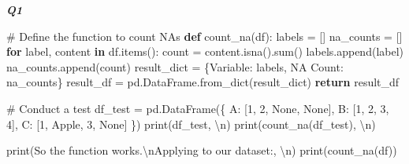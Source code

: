 \documentclass[
  letterpaper,
  DIV=11,
  numbers=noendperiod]{scrartcl}
\newenvironment{Shaded}{\begin{snugshade}}{\end{snugshade}}
\newcommand{\BuiltInTok}[1]{\textcolor[rgb]{0.00,0.23,0.31}{#1}}
\newcommand{\CharTok}[1]{\textcolor[rgb]{0.13,0.47,0.30}{#1}}
\newcommand{\CommentTok}[1]{\textcolor[rgb]{0.37,0.37,0.37}{#1}}
\newcommand{\ControlFlowTok}[1]{\textcolor[rgb]{0.00,0.23,0.31}{\textbf{#1}}}
\newcommand{\DecValTok}[1]{\textcolor[rgb]{0.68,0.00,0.00}{#1}}
\newcommand{\KeywordTok}[1]{\textcolor[rgb]{0.00,0.23,0.31}{\textbf{#1}}}
\newcommand{\NormalTok}[1]{\textcolor[rgb]{0.00,0.23,0.31}{#1}}
\newcommand{\OperatorTok}[1]{\textcolor[rgb]{0.37,0.37,0.37}{#1}}
\newcommand{\StringTok}[1]{\textcolor[rgb]{0.13,0.47,0.30}{#1}}
\newcommand{\VariableTok}[1]{\textcolor[rgb]{0.07,0.07,0.07}{#1}}
\begin{document}
\textbf{\emph{Q1}}

\begin{Shaded}
\begin{Highlighting}[]
\CommentTok{\# Define the function to count NAs}
\KeywordTok{def}\NormalTok{ count\_na(df):}
\NormalTok{    labels }\OperatorTok{=}\NormalTok{ []  }
\NormalTok{    na\_counts }\OperatorTok{=}\NormalTok{ [] }
    \ControlFlowTok{for}\NormalTok{ label, content }\KeywordTok{in}\NormalTok{ df.items():}
\NormalTok{        count }\OperatorTok{=}\NormalTok{ content.isna().}\BuiltInTok{sum}\NormalTok{()}
\NormalTok{        labels.append(label)}
\NormalTok{        na\_counts.append(count)}
\NormalTok{    result\_dict }\OperatorTok{=}\NormalTok{ \{}\StringTok{\textquotesingle{}Variable\textquotesingle{}}\NormalTok{: labels, }\StringTok{\textquotesingle{}NA Count\textquotesingle{}}\NormalTok{: na\_counts\}}
\NormalTok{    result\_df }\OperatorTok{=}\NormalTok{ pd.DataFrame.from\_dict(result\_dict)}
    \ControlFlowTok{return}\NormalTok{ result\_df}


\CommentTok{\# Conduct a test}
\NormalTok{df\_test }\OperatorTok{=}\NormalTok{ pd.DataFrame(\{}
    \StringTok{\textquotesingle{}A\textquotesingle{}}\NormalTok{: [}\DecValTok{1}\NormalTok{, }\DecValTok{2}\NormalTok{, }\VariableTok{None}\NormalTok{, }\VariableTok{None}\NormalTok{],}
    \StringTok{\textquotesingle{}B\textquotesingle{}}\NormalTok{: [}\DecValTok{1}\NormalTok{, }\DecValTok{2}\NormalTok{, }\DecValTok{3}\NormalTok{, }\DecValTok{4}\NormalTok{],}
    \StringTok{\textquotesingle{}C\textquotesingle{}}\NormalTok{: [}\DecValTok{1}\NormalTok{, }\StringTok{\textquotesingle{}Apple\textquotesingle{}}\NormalTok{, }\DecValTok{3}\NormalTok{, }\VariableTok{None}\NormalTok{]}
\NormalTok{\})}
\BuiltInTok{print}\NormalTok{(df\_test, }\StringTok{\textquotesingle{}}\CharTok{\textbackslash{}n}\StringTok{\textquotesingle{}}\NormalTok{)}
\BuiltInTok{print}\NormalTok{(count\_na(df\_test), }\StringTok{\textquotesingle{}}\CharTok{\textbackslash{}n}\StringTok{\textquotesingle{}}\NormalTok{)}

\BuiltInTok{print}\NormalTok{(}\StringTok{\textquotesingle{}So the function works.}\CharTok{\textbackslash{}n}\StringTok{Applying to our dataset:\textquotesingle{}}\NormalTok{, }\StringTok{\textquotesingle{}}\CharTok{\textbackslash{}n}\StringTok{\textquotesingle{}}\NormalTok{)}
\BuiltInTok{print}\NormalTok{(count\_na(df))}
\end{Highlighting}
\end{Shaded}
\end{document}
